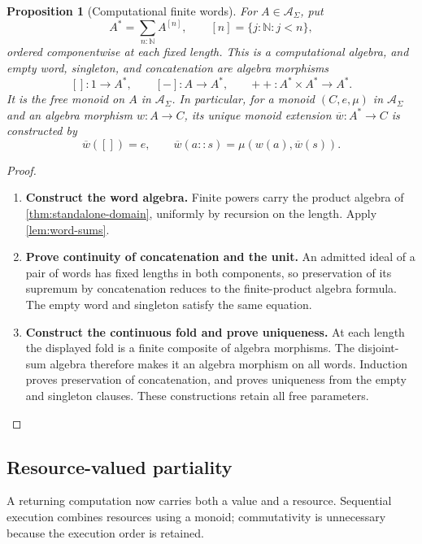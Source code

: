 \documentclass[11pt,a4paper]{article}
\numberwithin{algorithm}{section}
\numberwithin{equation}{section}
\newtheorem{proposition}[proposition]{Proposition}
\theoremstyle{definition}
\theoremstyle{remark}
\theoremstyle{plain}
\newcommand{\N}{\mathbb N}
\newcommand{\AS}{\mathcal A_{\Sigma}}
\theoremstyle{definition}
\theoremstyle{plain}
\begin{document}
\begin{proposition}[Computational finite words]\label{prop:finite-words}
For $A\in\AS$, put
\[
 A^*=\sum_{n:\N}A^{[n]},\qquad [n]=\{j:\N:j<n\},
\]
ordered componentwise at each fixed length. This is a computational
algebra, and empty word, singleton, and concatenation are algebra morphisms
\[
 []:1\to A^*,\qquad [-]:A\to A^*,\qquad
 {+\!+}:A^*\times A^*\to A^*.
\]
It is the free monoid on $A$ in $\AS$. In particular, for a monoid
$(C,e,\mu)$ in $\AS$ and an algebra morphism $w:A\to C$, its unique
monoid extension $\overline w:A^*\to C$ is constructed by
\[
 \overline w([])=e,\qquad
 \overline w(a::s)=\mu(w(a),\overline w(s)).
\]
\end{proposition}
\begin{proof}\leavevmode
\begin{enumerate}[leftmargin=*,align=left]
\item \textbf{Construct the word algebra.}
Finite powers carry the product algebra of \cref{thm:standalone-domain}, uniformly by recursion
on the length. Apply \cref{lem:word-sums}.

\item \textbf{Prove continuity of concatenation and the unit.}
An admitted ideal of a pair
of words has fixed lengths in both components, so preservation of its
supremum by concatenation reduces to the finite-product algebra formula.
The empty word and singleton satisfy the same equation.

\item \textbf{Construct the continuous fold and prove uniqueness.}
At each length
the displayed fold is a finite composite of algebra morphisms. The
disjoint-sum algebra therefore makes it an algebra morphism on all words.
Induction proves preservation of concatenation, and proves uniqueness
from the empty and singleton clauses. These constructions retain all
free parameters.
\end{enumerate}
\end{proof}

\subsection{Resource-valued partiality}
A returning computation now carries both a value and a resource.
Sequential execution combines resources using a monoid; commutativity
is unnecessary because the execution order is retained.
\end{document}
